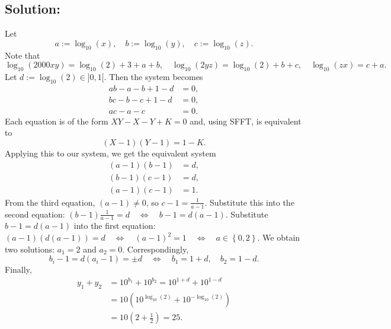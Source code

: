 \begin{solution}
    \subsection*{Solution:} Let
    \[
        a := \log_{10}\left(x\right), \quad b := \log_{10}\left(y\right), \quad c := \log_{10}\left(z\right).
    \]
    Note that
    \[
        \log_{10}\left(2000xy\right) = \log_{10}\left(2\right) + 3 + a + b, \quad \log_{10}\left(2yz\right) = \log_{10}\left(2\right) + b + c, \quad \log_{10}\left(zx\right) = c + a.
    \]
    Let \( d := \log_{10}\left(2\right)\in ]0,1[ \). Then the system becomes
    \begin{align*}
        ab - a - b + 1 - d &= 0, \\
        bc - b - c + 1 - d &= 0, \\
        ac - a - c &= 0.
    \end{align*}
    Each equation is of the form \( XY - X - Y + K = 0 \) and, using SFFT, is equivalent to
    \[
        \left(X - 1\right)\left(Y - 1\right) = 1 - K.
    \]
    Applying this to our system, we get the equivalent system
    \begin{align*}
        \left(a - 1\right)\left(b - 1\right) &= d, \\
        \left(b - 1\right)\left(c - 1\right) &= d, \\
        \left(a - 1\right)\left(c - 1\right) &= 1.
    \end{align*}
    From the third equation, \( \left(a - 1\right) \neq 0 \), so \( c - 1 = \frac{1}{a - 1} \). Substitute this into the second equation: \( \left(b - 1\right)\frac{1}{a - 1} = d \quad \Leftrightarrow \quad b - 1 = d\left(a - 1\right) \). Substitute \( b - 1 = d\left(a - 1\right) \) into the first equation: \( \left(a - 1\right)\left(d\left(a - 1\right)\right) = d \quad \Leftrightarrow \quad \left(a - 1\right)^{2} = 1 \quad \Leftrightarrow \quad a \in \left\{0, 2\right\} \). We obtain two solutions: \( a_{1} = 2 \) and \( a_{2} = 0 \). Correspondingly,
    \[
        b_{i} - 1 = d\left(a_{i} - 1\right) = \pm d \quad \Leftrightarrow \quad b_{1} = 1 + d, \quad b_{2} = 1 - d.
    \]
    Finally,
    \begin{align*}
        y_{1} + y_{2} &= 10^{b_{1}} + 10^{b_{2}} = 10^{1 + d} + 10^{1 - d} \\
        &= 10\left(10^{\log_{10}\left(2\right)} + 10^{-\log_{10}\left(2\right)}\right) \\
        &= 10\left(2 + \frac{1}{2}\right) = 25.
    \end{align*}
\end{solution}
